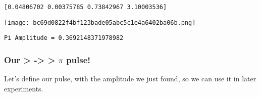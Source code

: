 \begin{Shaded}
\begin{Highlighting}[]
\OperatorTok{=}\NormalTok{)}
\OperatorTok{=}\NormalTok{)}

\OperatorTok{=} \OperatorTok{/} \NormalTok{)}
\NormalTok{(}\SpecialCharTok{\{}\SpecialCharTok{\}}\NormalTok{)}
\end{Highlighting}
\end{Shaded}

\begin{verbatim}
[0.04806702 0.00375785 0.73842967 3.10003536]
\end{verbatim}

\texttt{[image: bc69d0822f4bf123bade05abc5c1e4a6402ba06b.png]}

\begin{verbatim}
Pi Amplitude = 0.3692148371978982
\end{verbatim}

\hypertarget{2690bc89-ed3f-4803-a628-7ca3a5a45569}{}
\hypertarget{our-1---2-pi-pulse}{%
\subsubsection{\texorpdfstring{Our \textgreater{}
-\textgreater{} \textgreater{} \(\pi\)
pulse!}{Our \textgreater{} -\textgreater{} \textgreater{} \textbackslash pi pulse!}}\label{our-1---2-pi-pulse}}

Let's define our pulse, with the amplitude we just found, so we can use
it in later experiments.

\hypertarget{152b6d6c-24f1-43df-be9b-05d093007719}{}
\begin{Shaded}
\begin{Highlighting}[]
\OperatorTok{=}\OperatorTok{*}\NormalTok{))}
\OperatorTok{=}\OperatorTok{*}\NormalTok{)}
\OperatorTok{=}
\OperatorTok{=}
\OperatorTok{=}
\OperatorTok{=}
\OperatorTok{=}
\OperatorTok{=}
\end{Highlighting}
\end{Shaded}

